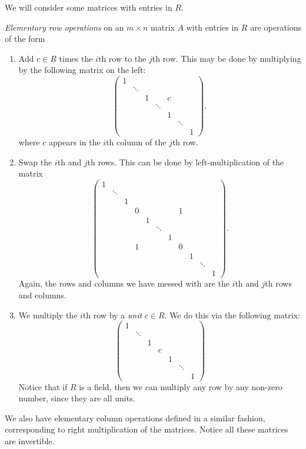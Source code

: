 \documentclass[a4paper]{article}
\begin{document}
We will consider some matrices with entries in $R$.

\begin{defi}
  \emph{Elementary row operations} on an $m \times n$ matrix $A$ with entries in $R$ are operations of the form
  \begin{enumerate}
    \item Add $c \in R$ times the $i$th row to the $j$th row. This may be done by multiplying by the following matrix on the left:
      \[
        \begin{pmatrix}
          1 \\
          & \ddots \\
          & & 1 & & c\\
          & & & \ddots\\
          & & & & 1\\
          & & & & & \ddots\\
          & & & & & & 1
        \end{pmatrix},
      \]
      where $c$ appears in the $i$th column of the $j$th row.
    \item Swap the $i$th and $j$th rows. This can be done by left-multiplication of the matrix
      \setcounter{MaxMatrixCols}{11}
      \[
        \begin{pmatrix}
          1\\
          & \ddots\\
          & & 1\\
          & & & 0 & & & & 1\\
          & & & & 1\\
          & & & & & \ddots\\
          & & & & & & 1\\
          & & & 1 & & & & 0\\
          & & & & & & & & 1\\
          & & & & & & & & & \ddots\\
          & & & & & & & & & & 1
        \end{pmatrix}.
      \]
      Again, the rows and columns we have messed with are the $i$th and $j$th rows and columns.
    \item We multiply the $i$th row by a \emph{unit} $c \in R$. We do this via the following matrix:
      \[
        \begin{pmatrix}
          1 \\
          & \ddots\\
          & & 1 \\
          & & & c\\
          & & & & 1\\
          & & & & & \ddots\\
          & & & & & & 1
        \end{pmatrix}
      \]
      Notice that if $R$ is a field, then we can multiply any row by any non-zero number, since they are all units.
  \end{enumerate}
  We also have elementary column operations defined in a similar fashion, corresponding to right multiplication of the matrices. Notice all these matrices are invertible.
\end{defi}
\end{document}
